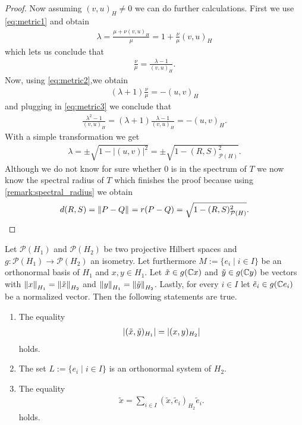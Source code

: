 \begin{proof}
	Now assuming $(v,u)_H \neq 0$ we can do further calculations. First we use \eqref{eq:metric1} and obtain
	\begin{align*}
		\lambda = \frac{\mu + \nu (v,u)_H}{\mu} = 1 + \frac{\nu}{\mu} (v,u)_H 
	\end{align*}
	which lets us conclude that 
	\begin{align}
		\frac{\nu}{\mu} = \frac{\lambda - 1}{(v,u)_H}. \label{eq:metric3}
	\end{align}
	Now, using \eqref{eq:metric2},we obtain
	\begin{align*}
		 (\lambda + 1) \frac{\nu}{\mu} =  -(u,v)_H 
	\end{align*}
	and plugging in \eqref{eq:metric3} we conclude that
	\begin{align*}
			\frac{\lambda^2 - 1}{(v,u)_H} = (\lambda + 1) \frac{\lambda - 1}{(v,u)_H} =  - (u,v)_H.
	\end{align*}
	With a simple transformation we get
	\begin{align*}
		\lambda = \pm \sqrt{1 - |(u,v)|^2} = \pm \sqrt{1 - (R,S)_{\mathcal{P}(H)}^2}.
	\end{align*}
	Although we do not know for sure whether $0$ is in the spectrum of $T$ we now know the spectral radius of $T$ which finishes the proof because using \ref{remark:spectral_radius} we obtain
	\begin{align*}
		d(R,S) = \norm{P - Q} = r(P - Q) = \sqrt{1 - (R,S)_{\mathcal{P}(H)}^2}.
	\end{align*}
\end{proof}


\begin{lemma}
	Let $\mathcal{P}(H_1)$ and $\mathcal{P}(H_2)$ be two projective Hilbert spaces and $g: \mathcal{P}(H_1) \to \mathcal{P}(H_2)$ an isometry. Let furthermore $M := \{e_i \mid i \in I\}$ be an orthonormal basis of $H_1$ and $x,y \in H_1 $. Let $\tilde{x} \in g(\C x)$ and $\tilde{y} \in g(\C y)$  be vectors with $\norm[H_1]{x} = \norm[H_2]{\tilde{x}}$ and $\norm[H_1]{y} = \norm[H_2]{\tilde{y}}$. Lastly, for every $i \in I$ let $\tilde{e}_i \in g(\C e_i)$ be a normalized vector. Then the  following statements are true.
	
	\begin{enumerate}
		\item The equality
		\begin{align} 
			\vbraces{(\tilde{x}, \tilde{y})_{H_1}} = \vbraces{(x, y)_{H_2}} \label{eq:vector_isometry}
		\end{align}
		holds.		
		
		\item The set $L:=\{e_i \mid i \in I\}$ is an orthonormal system of $H_2$. \label{bullet:ran_ons}
		
		\item The equality
		\begin{align}
			\tilde{x} = \sum_{i \in I} (\tilde{x}, \tilde{e}_i)_{H_2} \tilde{e}_i. \label{eq:ran_fourier}
		\end{align}
		holds.
		
	\end{enumerate} 
\end{lemma}

